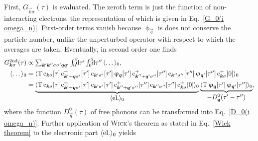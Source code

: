 First, $G_{\vec k \sigma}(\tau)$ is evaluated. The zeroth term is just the
 function of non-interacting electrons, the 
representation of which is given in Eq.~\ref{G_0(i omega_n)}. First-order terms
vanish because $\upphi_{\vec q}$ is does not conserve the particle number,
unlike the unperturbed  operator with respect to which the
averages are taken. Eventually, in second order one finds
%
\begin{align} \label{Holstein 2nd}
    G \super{2nd}_{\vec k \sigma}(\tau) &\propto
    \sum_{\vec k' \vec k'' \sigma \sigma' \vec q \vec q'}
    \int \from 0 \till \beta \D \tau' \int \from 0 \till \beta \D \tau'' \,
    \av \dots_0,
    \\ \notag
    \av \dots_0 &= \av{\op T \,
        \op c_{\vec k \sigma}[\tau] \,
        \op c_{\vec k' + \vec q \sigma'}^+[\tau'] \,
        \op c_{\vec k' \sigma'}[\tau'] \,
        \upphi_{\vec q}[\tau'] \,
        \op c_{\vec k'' + \vec q' \sigma''}^+[\tau''] \,
        \op c_{\vec k'' \sigma''}[\tau''] \,
        \upphi_{\vec q'}[\tau''] \,
        \op c_{\vec k \sigma}^+[0]}_0
    \\ \notag
    &= \underbrace{
            \av{\op T \,
                \op c_{\vec k \sigma}[\tau] \,
                \op c_{\vec k' + \vec q \sigma'}^+[\tau'] \,
                \op c_{\vec k' \sigma'}[\tau'] \,
                \op c_{\vec k'' + \vec q' \sigma''}^+[\tau''] \,
                \op c_{\vec k'' \sigma''}[\tau''] \,
                \op c_{\vec k \sigma}^+[0]}_0
            }_{\displaystyle \av{\text{el.}}_0}
        \underbrace{
            \av{\op T \,
                \upphi_{\vec q}[\tau'] \,
                \upphi_{\vec q'}[\tau'']}_0
            }_{\displaystyle -D^0_{\vec q}(\tau' - \tau'')},
\end{align}
%
where the  function $D^0_{\vec q}(\tau)$ of free phonons can be
transformed into Eq.~\ref{D_0(i omega_n)}. Further application of
\textsc{Wick}'s theorem as stated in Eq.~\ref{Wick theorem} to the electronic
part $\langle\text{el.}\rangle_0$ yields
%
\begingroup
    \def\minalignsep{0pt}
